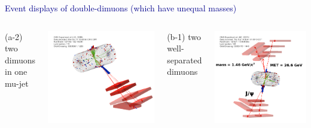\documentclass[compress]{beamer}
\begin{document}
\begin{frame}
\vspace{0.75 cm}
\begin{center}
\textcolor{darkblue}{\large Event displays of double-dimuons (which have unequal masses)}
\end{center}

\begin{columns}
\centering (a-2) two dimuons in one mu-jet

\includegraphics[width=\linewidth]{quadmu_control_eventdisplay.png}

\centering (b-1) two well-separated dimuons

\includegraphics[width=\linewidth]{dimudimu_control_eventdisplay.png}
\end{columns}
\end{frame}
\end{document}
